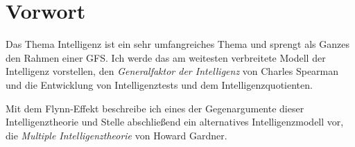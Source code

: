 \chapter{Vorwort}
Das Thema Intelligenz ist ein sehr umfangreiches Thema und sprengt als Ganzes den Rahmen einer GFS. Ich werde das am weitesten verbreitete Modell der Intelligenz vorstellen, den \emph{Generalfaktor der Intelligenz} von Charles Spearman und die Entwicklung von Intelligenztests und dem Intelligenzquotienten.

Mit dem Flynn-Effekt beschreibe ich eines der Gegenargumente dieser Intelligenztheorie und Stelle abschließend ein alternatives Intelligenzmodell vor, die \emph{Multiple Intelligenztheorie} von Howard Gardner.
